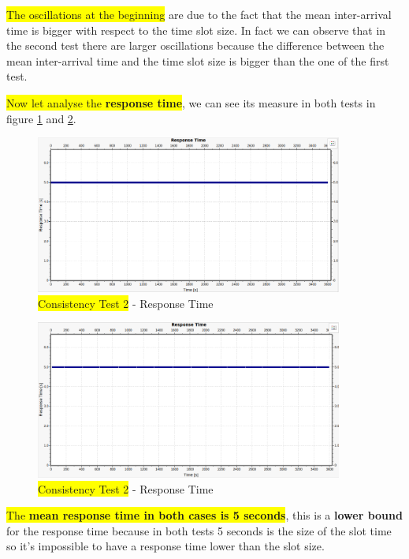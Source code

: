 \noindent \colorbox{yellow}{The oscillations at the beginning} are due to the fact that the mean inter-arrival time is bigger with respect to the time slot size. In fact we can observe that in the second test there are larger oscillations because the difference between the mean inter-arrival time and the time slot size is bigger than the one of the first test.

\noindent \colorbox{yellow}{Now let analyse the \textbf{response time}}, we can see its measure in both tests in figure \ref{img: consistencyTest1a_responsetime} and \ref{img: consistencyTest1b_responsetime}.

\begin{figure}[H]
	\centering
	\includegraphics[width=0.9\textwidth]{img/consistencytest1a_responsetime.png}
	\caption{\colorbox{yellow}{Consistency Test 2} - Response Time}
	\label {img: consistencyTest1a_responsetime}
\end{figure}

\begin{figure}[H]
	\centering
	\includegraphics[width=0.9\textwidth]{img/consistencytest1b_responsetime.png}
	\caption{\colorbox{yellow}{Consistency Test 2} - Response Time}
	\label {img: consistencyTest1b_responsetime}
\end{figure}


\noindent \colorbox{yellow}{The \textbf{mean response time in both cases is 5 seconds}}, this is a \textbf{lower bound} for the response time because in both tests 5 seconds is the size of the slot time so it's impossible to have a response time lower than the slot size.

